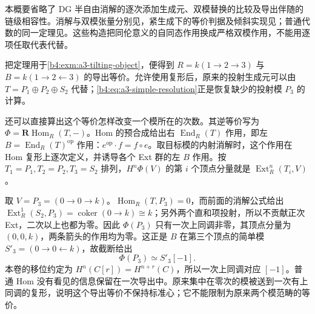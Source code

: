 \begin{proofsketch}
	本概要省略了 DG 半自由消解的逐次添加生成元、双模替换的比较及导出伴随的链级相容性。消解与双模张量分别见\cite[Sections 3.1 and 6.1--6.3]{Keller1994DerivingDG}，紧生成下的等价判据及倾斜实现见\cite[Sections 4.2, 8.2 and 9.1--9.2]{Keller1994DerivingDG}；普通代数的同一定理见\cite[Section 4, Theorem (Rickard)]{Keller1998AbelianDerived}。这些构造把同伦意义的自同态作用换成严格双模作用，不能用逐项任取代表代替。
\end{proofsketch}

把定理用于\cref{b4:exm:a3-tilting-object}，便得到 \(R=k(1\to2\to3)\) 与 \(B=k(1\to2\leftarrow3)\) 的导出等价。允许使用复形后，原来的投射生成元可以由 \(T=P_1\oplus P_2\oplus S_2\) 代替；\eqref{b4:eq:a3-simple-resolution}正是恢复缺少的投射模 \(P_3\) 的计算。

\ProseParagraphBreak
还可以直接算出这个等价怎样改变一个模所在的次数。其逆等价写为 \(\Phi=\mathbf R\operatorname{Hom}_R(T,-)\)。Hom 的预合成给出右 \(\operatorname{End}_R(T)\) 作用，即左 \(B=\operatorname{End}_R(T)^{\mathrm{op}}\) 作用：\(e^{\mathrm{op}}\cdot f=f\circ e\)。取目标模的内射消解时，这个作用在 Hom 复形上逐次定义，并诱导各个 Ext 群的左 \(B\) 作用。按 \(T_1=P_1,T_2=P_2,T_3=S_2\) 排列，\(H^n\Phi(V)\) 的第 \(i\) 个顶点分量就是 \(\operatorname{Ext}_R^n(T_i,V)\)。

\ProseParagraphBreak
取 \(V=P_3=(0\to0\to k)\)。\(\operatorname{Hom}_R(T,P_3)=0\)，而前面的消解公式给出 \(\operatorname{Ext}^1_R(S_2,P_3)=\operatorname{coker}(0\to k)\cong k\)；另外两个直和项投射，所以不贡献正次 Ext，二次以上也都为零。因此 \(\Phi(P_3)\) 只有一次上同调非零，其顶点分量为 \((0,0,k)\)，两条箭头的作用均为零。这正是 \(B\) 在第三个顶点的简单模 \(S'_3=(0\to0\leftarrow k)\)，故截断给出
\[
	\Phi(P_3)\simeq S'_3[-1].
\]
本卷的移位约定为 \(H^n(C[r])=H^{n+r}(C)\)，所以一次上同调对应 \([-1]\)。普通 Hom 没有看见的信息保留在一次导出中。原来集中在零次的模被送到一次有上同调的复形，说明这个导出等价不保持标准心；它不能限制为原来两个模范畴的等价。
